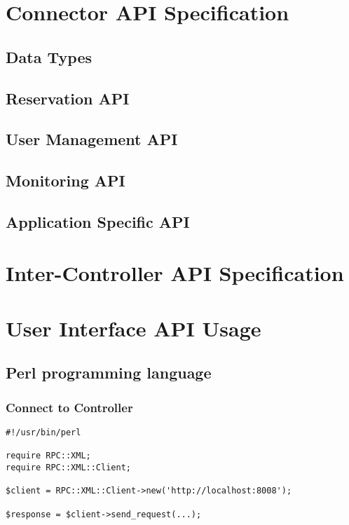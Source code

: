 \documentclass[a4paper]{report}
\begin{document}
\chapter{Connector API Specification}

\section{Data Types}

\section{Reservation API}

\section{User Management API}

\section{Monitoring API}

\section{Application Specific API}




\chapter{Inter-Controller API Specification}


\appendix

\chapter{User Interface API Usage}

\section{Perl programming language}

\subsection{Connect to Controller}

\begin{verbatim}
#!/usr/bin/perl

require RPC::XML;
require RPC::XML::Client;

$client = RPC::XML::Client->new('http://localhost:8008');

$response = $client->send_request(...);
\end{verbatim}
\end{document}
